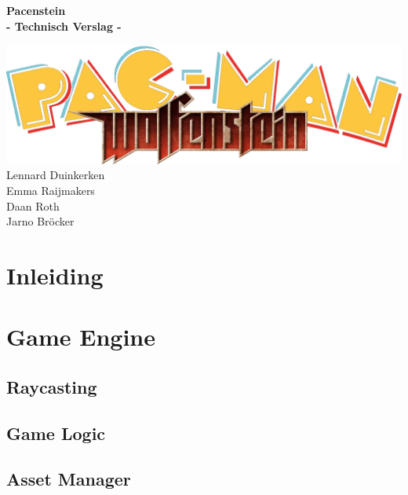 \documentclass{report}
\begin{document}
\begin{titlepage}
\centering
\vfill
\bfseries\Huge{Pacenstein\\\large{- Technisch Verslag -}}\\
\normalfont\normalsize{}
\vfill

\includegraphics[width=\textwidth]{../res/pacenstein.png}
\vfill
\large{
  Lennard Duinkerken\\
  Emma Raijmakers\\
  Daan Roth\\
  Jarno Bröcker
}
\vfill
\end{titlepage}

\tableofcontents

\chapter{Inleiding} %
\label{cha:inleiding}


\chapter{Game Engine} %
\label{cha:game_engine}

  \section{Raycasting} %
  \label{sec:raycasting}


  \section{Game Logic} %
  \label{sec:game_logic}


  \section{Asset Manager} %
  \label{sec:asset_manager}
\end{document}
